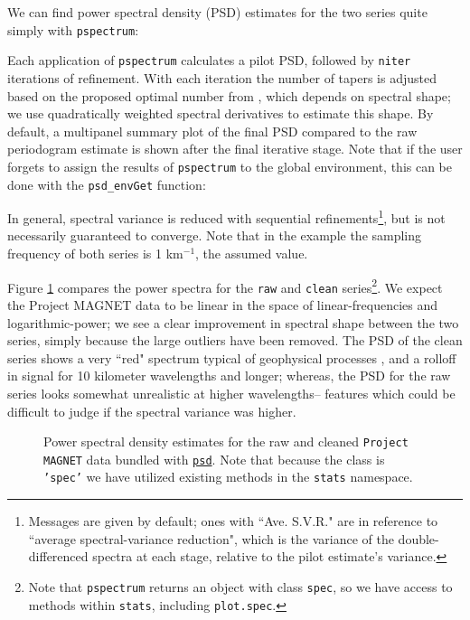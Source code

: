 \documentclass[10pt]{article}\usepackage[]{graphicx}\usepackage[]{color}
\newcommand{\Rcmd}[1]{\texttt{#1}}
\newcommand{\psd}[0]{\href{http://www.github.com/abarbour/psd/}{\color{blue}\Rcmd{psd}}}
\begin{document}
We can find power spectral density (PSD)
estimates for the two series quite simply with \Rcmd{pspectrum}:

Each application of \Rcmd{pspectrum} calculates a pilot PSD, followed by 
\Rcmd{niter}
iterations of refinement.
With each iteration
the number of tapers is adjusted 
based on the proposed optimal number from \citet{rs1995}, which
depends on spectral shape; we use 
quadratically weighted spectral derivatives \citep{prieto2007}
to estimate this shape.
By default, a multipanel summary plot of the final PSD compared
to the raw periodogram estimate is shown after the final iterative stage.
Note that if the user forgets to assign the results of
\Rcmd{pspectrum} to the global environment, this can be
done with the \Rcmd{psd\_envGet} function:


In general, spectral variance is reduced
with sequential refinements\footnote{
Messages are given by default; ones with
``Ave. S.V.R."
are in reference to 
 ``average spectral-variance reduction", which
 is the variance of the
 double-differenced spectra at each stage, relative
 to the pilot estimate's variance.
}, but is not necessarily guaranteed to converge.
Note that in the example
the sampling frequency of both series
is 1 km$^{-1}$, the assumed value.

Figure \ref{fig:pmag} compares the 
power spectra for the \Rcmd{raw} and \Rcmd{clean} 
series\footnote{
Note that \Rcmd{pspectrum} returns
an object with class \Rcmd{spec}, so we have access to methods 
within \Rcmd{stats}, including \Rcmd{plot.spec}.
}.  
We expect the Project MAGNET data to be linear in the space of
linear-frequencies and logarithmic-power;
we see a clear
improvement in spectral shape between the two series,
simply because the large outliers have been removed.
The PSD of the clean series shows a
very ``red" spectrum typical of geophysical processes \citep{agnew1992},
and a rolloff in signal
for 10 kilometer wavelengths and longer; whereas, the 
PSD for the raw series looks somewhat unrealistic at higher wavelengths--
features which could be difficult to judge if the spectral variance was higher.

\begin{figure}[!htbp]
\begin{center}

\caption{Power spectral density estimates for the raw and cleaned
             \Rcmd{Project MAGNET} data bundled with \psd{}. Note that
             because the class is \Rcmd{'spec'} we have
             utilized  existing methods in the \Rcmd{stats} namespace.}
\label{fig:pmag}
\end{center}
\end{figure}
\end{document}
